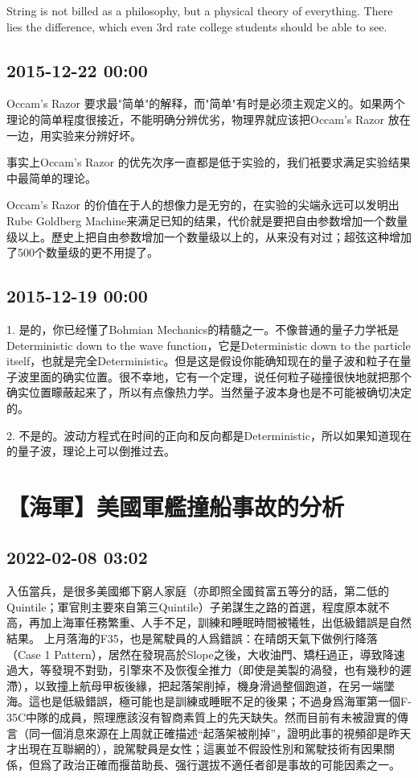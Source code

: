 \documentclass[twocolumn]{ctexart}
\begin{document}
String is not billed as a philosophy, but a physical theory of everything. There lies the difference, which even 3rd rate college students should be able to see.\subsection*{2015-12-22 00:00}
Occam's Razor 要求最"简单"的解释，而"简单"有时是必须主观定义的。如果两个理论的简单程度很接近，不能明确分辨优劣，物理界就应该把Occam's Razor 放在一边，用实验来分辨好坏。

事实上Occam's Razor 的优先次序一直都是低于实验的，我们衹要求满足实验结果中最简单的理论。

Occam's Razor 的价值在于人的想像力是无穷的，在实验的尖端永远可以发明出Rube Goldberg Machine来满足已知的结果，代价就是要把自由参数增加一个数量级以上。歷史上把自由参数增加一个数量级以上的，从来没有对过；超弦这种增加了500个数量级的更不用提了。
\subsection*{2015-12-19 00:00}
1. 是的，你已经懂了Bohmian Mechanics的精髓之一。不像普通的量子力学衹是Deterministic down to the wave function，它是Deterministic down to the particle itself，也就是完全Deterministic。但是这是假设你能确知现在的量子波和粒子在量子波里面的确实位置。很不幸地，它有一个定理，说任何粒子碰撞很快地就把那个确实位置矇蔽起来了，所以有点像热力学。当然量子波本身也是不可能被确切决定的。

2. 不是的。波动方程式在时间的正向和反向都是Deterministic，所以如果知道现在的量子波，理论上可以倒推过去。\section*{【海軍】美國軍艦撞船事故的分析}
\subsection*{2022-02-08 03:02}

入伍當兵，是很多美國鄉下窮人家庭（亦即照全國貧富五等分的話，第二低的Quintile；軍官則主要來自第三Quintile）子弟謀生之路的首選，程度原本就不高，再加上海軍任務繁重、人手不足，訓練和睡眠時間被犧牲，出低級錯誤是自然結果。
上月落海的F35，也是駕駛員的人爲錯誤：在晴朗天氣下做例行降落（Case 1 Pattern），居然在發現高於Slope之後，大收油門、矯枉過正，導致降速過大，等發現不對勁，引擎來不及恢復全推力（即使是美製的渦發，也有幾秒的遲滯），以致撞上航母甲板後緣，把起落架削掉，機身滑過整個跑道，在另一端墜海。這也是低級錯誤，極可能也是訓練或睡眠不足的後果；不過身爲海軍第一個F-35C中隊的成員，照理應該沒有智商素質上的先天缺失。然而目前有未被證實的傳言（同一個消息來源在上周就正確描述“起落架被削掉”，證明此事的視頻卻是昨天才出現在互聯網的），說駕駛員是女性；這裏並不假設性別和駕駛技術有因果關係，但爲了政治正確而揠苗助長、强行選拔不適任者卻是事故的可能因素之一。
\end{document}
